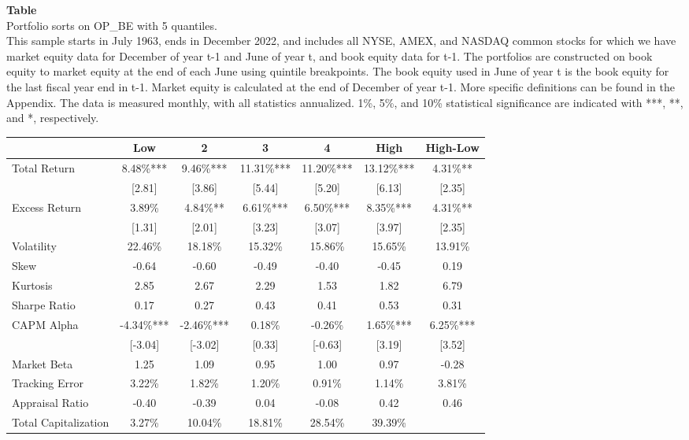 \begin{table*}[ht!]
\raggedright
{}
\label{tab: summary_stats_OP_BE_with_5_quantiles}
\textbf{Table \thetable} \\
Portfolio sorts on OP\_BE with 5 quantiles. \\
\hspace*{1em}This sample starts in July 1963, ends in December 2022, and includes all NYSE, AMEX, and NASDAQ common stocks for which we have market equity data for December of year t-1 and June of year t, and book equity data for t-1. The portfolios are constructed on book equity to market equity at the end of each June using quintile breakpoints.  The book equity used in June of year t is the book equity for the last fiscal year end in t-1.  Market equity is calculated at the end of December of year t-1.  More specific definitions can be found in the Appendix.  The data is measured monthly, with all statistics annualized.  1\%, 5\%, and 10\% statistical significance are indicated with ***, **, and *, respectively. \\
\vspace{0.5em}
\centering
\begin{adjustbox}{max width=\textwidth}
\begin{tabular}{@{}lcccccc@{}}
\toprule
 & Low & 2 & 3 & 4 & High & High-Low \\
\midrule
Total Return & 8.48\%*** & 9.46\%*** & 11.31\%*** & 11.20\%*** & 13.12\%*** & 4.31\%** \\
 & [2.81] & [3.86] & [5.44] & [5.20] & [6.13] & [2.35] \\
Excess Return & 3.89\% & 4.84\%** & 6.61\%*** & 6.50\%*** & 8.35\%*** & 4.31\%** \\
 & [1.31] & [2.01] & [3.23] & [3.07] & [3.97] & [2.35] \\
Volatility & 22.46\% & 18.18\% & 15.32\% & 15.86\% & 15.65\% & 13.91\% \\
Skew & -0.64 & -0.60 & -0.49 & -0.40 & -0.45 & 0.19 \\
Kurtosis & 2.85 & 2.67 & 2.29 & 1.53 & 1.82 & 6.79 \\
Sharpe Ratio & 0.17 & 0.27 & 0.43 & 0.41 & 0.53 & 0.31 \\
CAPM Alpha & -4.34\%*** & -2.46\%*** & 0.18\% & -0.26\% & 1.65\%*** & 6.25\%*** \\
 & [-3.04] & [-3.02] & [0.33] & [-0.63] & [3.19] & [3.52] \\
Market Beta & 1.25 & 1.09 & 0.95 & 1.00 & 0.97 & -0.28 \\
Tracking Error & 3.22\% & 1.82\% & 1.20\% & 0.91\% & 1.14\% & 3.81\% \\
Appraisal Ratio & -0.40 & -0.39 & 0.04 & -0.08 & 0.42 & 0.46 \\
Total Capitalization & 3.27\% & 10.04\% & 18.81\% & 28.54\% & 39.39\% &  \\
\bottomrule
\end{tabular}
\end{adjustbox}
\end{table*}
